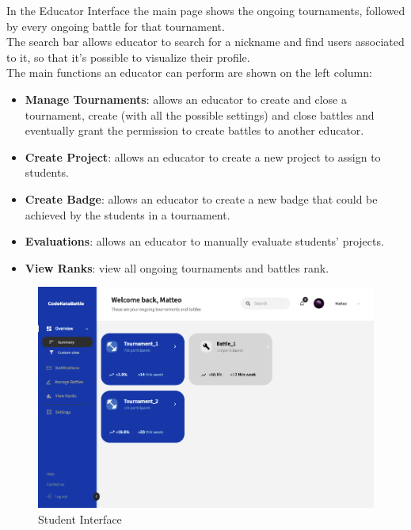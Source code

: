 \newpage

In the Educator Interface the main page shows the ongoing tournaments, followed by every ongoing battle for that tournament. \\The search bar allows educator to search for a nickname and find users associated to it, so that it's possible to visualize their profile. \\The main functions an educator can perform are shown on the left column: 
\begin{itemize}
    \item \textbf{Manage Tournaments}: allows an educator to create and close a tournament, create (with all the possible settings) and close battles and eventually grant the permission to create battles to another educator.
    \item \textbf{Create Project}: allows an educator to create a new project to assign to students. 
    \item \textbf{Create Badge}: allows an educator to create a new badge that could be achieved by the students in a tournament.
    \item \textbf{Evaluations}: allows an educator to manually evaluate students' projects.
    \item \textbf{View Ranks}: view all ongoing tournaments and battles rank.
\end{itemize}

\vspace{100pt}

\begin{figure}[h]
    \centering
    \includegraphics[scale=0.5]{src/student_view.png}
    \caption*{Student Interface}
\end{figure} \vspace{0.5cm}

